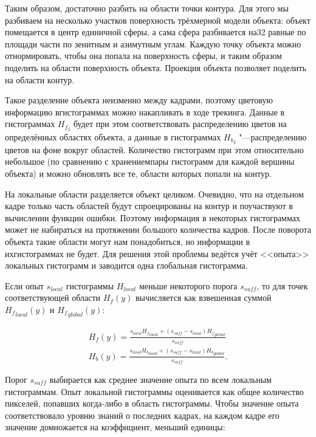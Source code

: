 Таким образом, достаточно разбить на области точки контура.
Для этого мы разбиваем на несколько участков поверхность трёхмерной модели
объекта: объект помещается в центр единичной сферы, а сама сфера разбивается
на32 равные по площади части по зенитным и азимутным углам.
Каждую точку объекта можно отнормировать, чтобы она попала на поверхность
сферы, и таким образом поделить на области поверхность объекта.
Проекция объекта позволяет поделить на области контур.

Такое разделение объекта неизменно между кадрами, поэтому цветовую информацию
вгистограммах можно накапливать в ходе трекинга.
Данные в гистограммах ${H_f}_i$ будет при этом соответствовать распределению
цветов на определённых областях объекта, а данные в гистограммах ${H_b}_i$
"---распределению цветов на фоне вокруг областей.
Количество гистограмм при этом относительно небольшое (по сравнению с
хранениемпары гистограмм для каждой вершины объекта) и можно обновлять все те,
области
которых попали на контур.

На локальные области разделяется объект целиком. 
Очевидно, что на отдельном кадре только часть областей будут спроецированы на
контур и поучаствуют в вычислении функции ошибки.
Поэтому информация в некоторых гистограммах может не набираться на протяжении
большого количества кадров.
После поворота объекта такие области могут нам понадобиться, но информации в
ихгистограммах не будет.
Для решения этой проблемы ведётся учёт <<опыта>> локальных гистограмм и
заводится одна глобальная гистограмма.

Если опыт $s_{local}$ гистограммы $H_{local}$ меньше некоторого порога
$s_{suff}$, то для точек соответствующей области $H_f(y)$ вычисляется как
взвешенная суммой ${H_f}_{local}(y)$ и ${H_f}_{global}(y)$:

\begin{equation}
\label{eqn:histo_skill}
\begin{array}{c}
H_f(y) = \frac{s_{local} {H_f}_{local} + (s_{suff} - s_{local})
{H_f}_{global}}{s_{suff}} \\
H_b(y) = \frac{s_{local} {H_b}_{local} + (s_{suff} - s_{local})
{H_b}_{global}}{s_{suff}}
\text{.}
\end{array}
\end{equation}

Порог $s_{suff}$ выбирается как среднее значение опыта по всем локальным
гистограммам.
Опыт локальной гистограммы оценивается как общее количество пикселей, попавших
когда-либо в область гистограммы.
Чтобы значение опыта соответствовало уровню знаний о последних кадрах, на
каждом кадре его значение домножается на коэффициент, меньший единицы:

